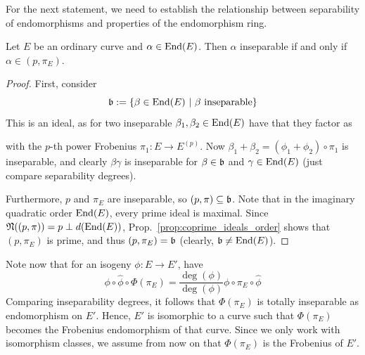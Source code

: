 For the next statement, we need to establish the relationship between separability of endomorphisms and properties of the endomorphism ring.
\begin{lemma}
    \label{prop:inseparable_iff_frobenius_ideal}
    Let $E$ be an ordinary curve and $\alpha \in \mathrm{End}(E)$.
    Then $\alpha$ inseparable if and only if $\alpha \in (p, \pi_E)$.
\end{lemma}
\begin{proof}
    First, consider
    \begin{equation*}
        \mathfrak{b} := \{ \beta \in \mathrm{End}(E) \ | \ \text{$\beta$ inseparable} \}
    \end{equation*}
    This is an ideal, as for two inseparable $\beta_1, \beta_2 \in \mathrm{End}(E)$ have that they factor as
    \begin{center}
    \end{center}
    with the $p$-th power Frobenius $\pi_1: E \to E^{(p)}$.
    Now $\beta_1 + \beta_2 = (\phi_1 + \phi_2) \circ \pi_1$ is inseparable, and clearly $\beta \gamma$ is inseparable for $\beta \in \mathfrak{b}$ and $\gamma \in \mathrm{End}(E)$ (just compare separability degrees).

    Furthermore, $p$ and $\pi_E$ are inseparable, so $(p, \pi) \subseteq \mathfrak{b}$.
    Note that in the imaginary quadratic order $\mathrm{End}(E)$, every prime ideal is maximal.
    Since $\mathfrak{N}((p, \pi)) = p \perp d(\mathrm{End}(E))$, Prop.~\ref{prop:coprime_ideals_order} shows that $(p, \pi_E)$ is prime, and thus $(p, \pi_E) = \mathfrak{b}$ (clearly, $\mathfrak{b} \neq \mathrm{End}(E)$).
\end{proof}
Note now that for an isogeny $\phi: E \to E'$, have
\begin{equation*}
    \phi \circ \hat{\phi} \circ \Phi(\pi_E) = \frac {\deg(\phi)} {\deg(\phi)} \phi \circ \pi_E \circ \hat{\phi}
\end{equation*}
Comparing inseparability degrees, it follows that $\Phi(\pi_E)$ is totally inseparable as endomorphism on $E'$.
Hence, $E'$ is isomorphic to a curve such that $\Phi(\pi_E)$ becomes the Frobenius endomorphism of that curve.
Since we only work with isomorphism classes, we assume from now on that $\Phi(\pi_E)$ is the Frobenius of $E'$.

